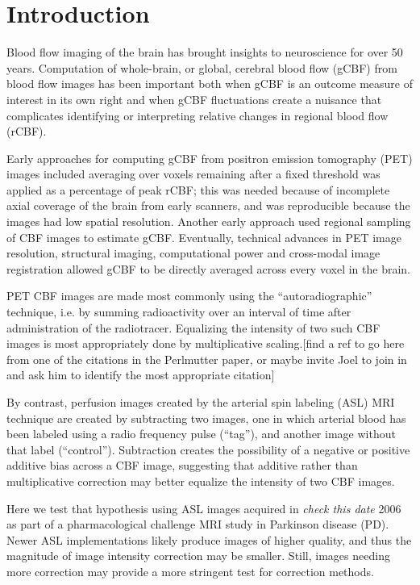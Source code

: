 \section{Introduction}
Blood flow imaging of the brain has brought insights to neuroscience for over 50 years.\cite{Taber_2005} Computation of whole-brain, or global, cerebral blood flow (gCBF) from blood flow images has been important both when gCBF is an outcome measure of interest in its own right and when gCBF fluctuations create a nuisance that complicates identifying or interpreting relative changes in regional blood flow (rCBF).\cite{Small_2004} 

Early approaches for computing gCBF from positron emission tomography (PET) images included averaging over voxels remaining after a fixed threshold was applied as a percentage of peak rCBF; this was needed because of incomplete axial coverage of the brain from early scanners, and was reproducible because the images had low spatial resolution.\cite{6609680} Another early approach used regional sampling of CBF images to estimate gCBF.\cite{6971299}\cite{Perlmutter_1985} Eventually, technical advances in PET image resolution, structural imaging, computational power and cross-modal image registration allowed gCBF to be directly averaged across every voxel in the brain.

PET CBF images are made most commonly using the ``autoradiographic'' technique, i.e. by summing radioactivity over an interval of time after administration of the radiotracer. Equalizing the intensity of two such CBF images is most appropriately done by multiplicative scaling.[find a ref to go here from one of the citations in the Perlmutter paper, or maybe invite Joel to join in and ask him to identify the most appropriate citation] 

By contrast, perfusion images created by the arterial spin labeling (ASL) MRI technique are created by subtracting two images, one in which arterial blood has been labeled using a radio frequency pulse (``tag''), and another image without that label (``control''). Subtraction creates the possibility of a negative or positive additive bias across a CBF image, suggesting that additive rather than multiplicative correction may better equalize the intensity of two CBF images.

Here we test that hypothesis using ASL images acquired in \textit{check this date} 2006 as part of a pharmacological challenge MRI study in Parkinson disease (PD). Newer ASL implementations likely produce images of higher quality, and thus the magnitude of image intensity correction may be smaller. Still, images needing more correction may provide a more stringent test for correction methods.